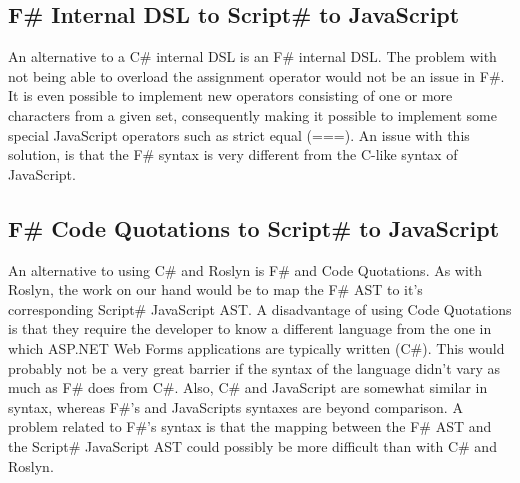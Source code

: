 	
		\subsection{F\# Internal DSL to Script\# to JavaScript} %
		\label{ssub:f_internal_dsl_to_script_to_javascript}
			An alternative to a C\# internal DSL is an F\# internal DSL. The problem with not being able to overload the assignment operator would not be an issue in F\#. It is even possible to implement new operators consisting of one or more characters from a given set, consequently making it possible to implement some special JavaScript operators such as strict equal (===). An issue with this solution, is that the F\# syntax is very different from the C-like syntax of JavaScript.

		\subsection{F\# Code Quotations to Script\# to JavaScript} %
		\label{ssub:f_code_quotations_to_script_to_javascript}
			An alternative to using C\# and Roslyn is F\# and Code Quotations. As with Roslyn, the work on our hand would be to map the F\# AST to it's corresponding Script\# JavaScript AST. A disadvantage of using Code Quotations is that they require the developer to know a different language from the one in which ASP.NET Web Forms applications are typically written (C\#). This would probably not be a very great barrier if the syntax of the language didn't vary as much as F\# does from C\#. Also, C\# and JavaScript are somewhat similar in syntax, whereas F\#'s and JavaScripts syntaxes are beyond comparison. A problem related to F\#'s syntax is that the mapping between the F\# AST and the Script\# JavaScript AST could possibly be more difficult than with C\# and Roslyn.

